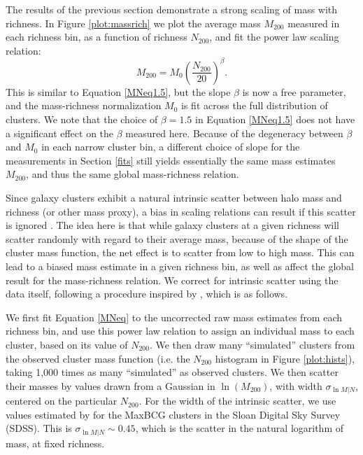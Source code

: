 \label{sec:MN}
The results of the previous section demonstrate a strong scaling of mass with richness. In Figure \ref{plot:massrich} we plot the average mass $M_{200}$ measured in each richness bin, as a function of richness $N_{200}$, and fit the power law scaling relation:
\begin{equation}
\label{MNeq}
M_{200} = M_0 \left( \frac{N_{200}}{20} \right)^\beta.
\end{equation}
This is similar to Equation \ref{MNeq1.5}, but the slope $\beta$ is now a free parameter, and the mass-richness normalization $M_0$ is fit across the full distribution of clusters. We note that the choice of $\beta=1.5$ in Equation \ref{MNeq1.5} does not have a significant effect on the $\beta$ measured here. Because of the degeneracy between $\beta$ and $M_0$ in each narrow cluster bin, a different choice of slope for the measurements in Section \ref{fits} still yields essentially the same mass estimates $M_{200}$, and thus the same global mass-richness relation.

Since galaxy clusters exhibit a natural intrinsic scatter between halo mass and richness (or other mass proxy), a bias in scaling relations can result if this scatter is ignored \citep{Rozo09a}. The idea here is that while galaxy clusters at a given richness will scatter randomly with regard to their average mass, because of the shape of the cluster mass function, the net effect is to scatter from low to high mass. This can lead to a biased mass estimate in a given richness bin, as well as affect the global result for the mass-richness relation. We correct for intrinsic scatter using the data itself, following a procedure inspired by \citet{Velander14}, which is as follows.

We first fit Equation \ref{MNeq} to the uncorrected raw mass estimates from each richness bin, and use this power law relation to assign an individual mass to each cluster, based on its value of $N_{200}$. We then draw many ``simulated'' clusters from the observed cluster mass function (i.e. the $N_{200}$ histogram in Figure \ref{plot:hists}), taking 1,000 times as many ``simulated'' as observed clusters. We then scatter their masses by values drawn from a Gaussian in $\ln (M_{200})$, with width $\sigma_{\ln M|N}$, centered on the particular $N_{200}$. For the width of the intrinsic scatter, we use values estimated by \citet{Rozo09a} for the MaxBCG clusters in the Sloan Digital Sky Survey (SDSS). This is $\sigma_{\ln M|N} \sim 0.45$, which is the scatter in the natural logarithm of mass, at fixed richness.


